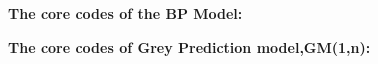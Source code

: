 \begin{appendices}
   
\textbf{\textcolor[rgb]{0.98,0.00,0.00}{The core codes of the BP Model:}}



\textbf{\textcolor[rgb]{0.98,0.00,0.00}{The core codes of Grey Prediction model,GM(1,n):}}

\end{appendices}
